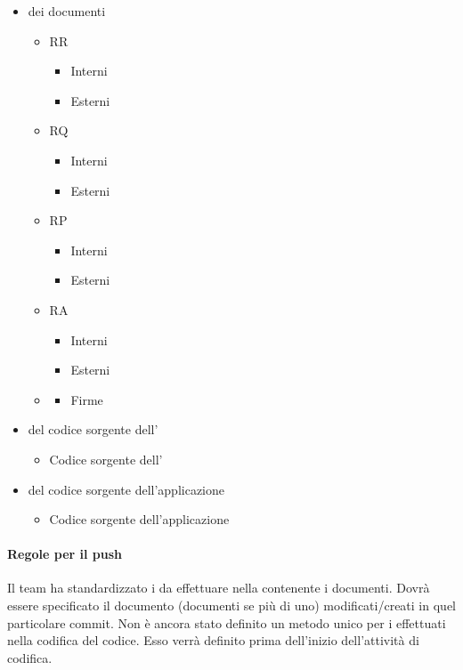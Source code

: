 \begin{itemize}
  \item {} dei documenti
  	\begin{itemize}
  		\item RR
			\begin{itemize}
				\item Interni
				\item Esterni
			\end{itemize}
  		\item RQ
  			\begin{itemize}
				\item Interni
				\item Esterni
			\end{itemize}
  		\item RP
  			\begin{itemize}
				\item Interni
				\item Esterni
			\end{itemize}
  		\item RA
  			\begin{itemize}
				\item Interni
				\item Esterni
			\end{itemize}
  		\item {}   			\begin{itemize}
  				\item Firme
  			\end{itemize}
  	\end{itemize}
  	\item {} del codice sorgente dell'
  		\begin{itemize}
  			\item Codice sorgente dell'
  		\end{itemize}
  	\item {} del codice sorgente dell'applicazione 
  		\begin{itemize}
  			\item Codice sorgente dell'applicazione 
  		\end{itemize}
  	
\end{itemize}

\paragraph{Regole per il push}
Il team ha standardizzato i  da effettuare nella  contenente i documenti. Dovrà essere specificato il documento (documenti se più di uno) modificati/creati in quel particolare commit. Non è ancora stato definito un metodo unico per i  effettuati nella codifica del codice. Esso verrà definito prima dell'inizio dell'attività di codifica.

